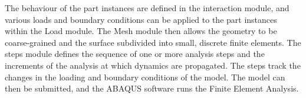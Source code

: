 The behaviour of the part instances are defined in the interaction module, and various loads and boundary conditions can be applied to the part instances within the Load module. The Mesh module then allows the geometry to be coarse-grained and the surface subdivided into small, discrete finite elements. The steps module defines the sequence of one or more analysis steps and the increments of the analysis at which dynamics are propagated. The steps track the changes in the loading and boundary conditions of the model. The model can then be submitted, and the ABAQUS software runs the Finite Element Analysis.

